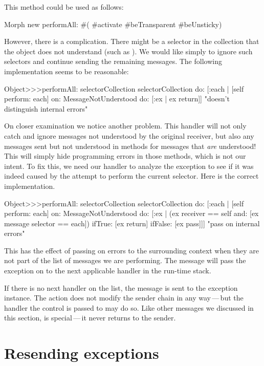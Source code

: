 \documentclass[a4paper,10pt,twoside]{book}
\begin{document}
This method could be used as follows:
\begin{code}{}
Morph new performAll: #( #activate #beTransparent #beUnsticky)
\end{code}

However, there is a complication. There might be a selector in the collection that the object does not understand (such as ). We would like simply to ignore such selectors and continue sending the remaining messages. The following implementation seems to be reasonable:

\begin{code}{}
Object>>>performAll: selectorCollection 
	selectorCollection do: [:each |
		[self perform: each]
			on: MessageNotUnderstood
			do: [:ex | ex return]]    "doesn't distinguish internal errors"
\end{code}

On closer examination we notice another problem. This handler will not only catch and ignore messages not understood by the original receiver, but also any messages sent but not understood in methods for messages that \emph{are} understood! This will simply hide programming errors in those methods, which is not our intent.
To fix this, we need our handler to analyze the exception to see if it was indeed caused by the attempt to perform the current selector.
Here is the correct implementation.
\begin{code}{}
Object>>>performAll: selectorCollection 
	selectorCollection do: [:each | 
		[self perform: each] 
			on: MessageNotUnderstood 
			do: [:ex | (ex receiver == self and: [ex message selector == each]) 
				ifTrue: [ex return] 
				ifFalse: [ex pass]]]    "pass on internal errors"
\end{code}

This has the effect of passing on  errors to the surrounding context when they are not part of the list of messages we are performing. The  message will pass the exception on to the next applicable handler in the run-time stack.

If there is no next handler on the list, the  message is sent to the exception instance. The  action does not modify the sender chain in any way\,---\,but the handler the control is passed to may do so. Like other messages we discussed in this section,  is special\,---\,it never returns to the sender.

\section{Resending exceptions}
\end{document}
